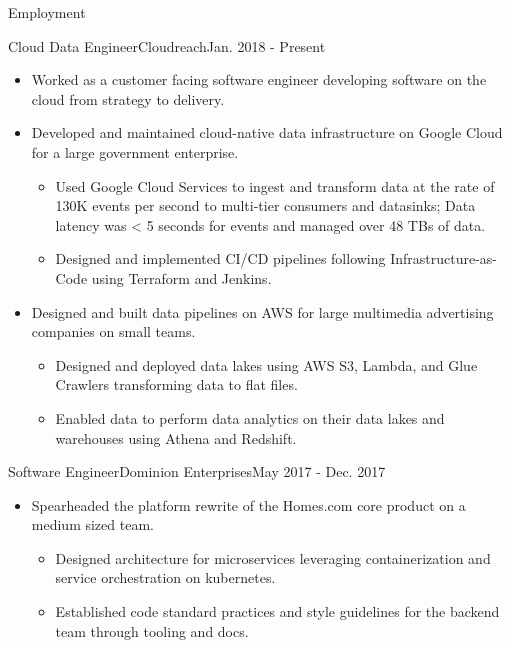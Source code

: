 \documentclass[]{mcdowellcv}
\begin{document}
    \makeheader

    \begin{cvsection}{Employment}


        \begin{cvsubsection}{Cloud Data Engineer}{Cloudreach}{Jan. 2018 - Present}
            \begin{itemize}
                \item Worked as a customer facing software engineer developing software on the cloud from strategy to delivery. 
                \item Developed and maintained cloud-native data infrastructure on Google Cloud for a large government enterprise.
                    \begin{itemize}
                            \item Used Google Cloud Services to ingest and transform data at the rate of 130K events per second to multi-tier consumers and datasinks; Data latency was < 5 seconds for events and managed over 48 TBs of data.
                            \item Designed and implemented CI/CD pipelines following Infrastructure-as-Code using Terraform and Jenkins.
                    \end{itemize}
                \end{itemize}
                \begin{itemize}
                    \item Designed and built data pipelines on AWS for large multimedia advertising companies on small teams.
                    \begin{itemize}
                        \item Designed and deployed data lakes using AWS S3, Lambda, and Glue Crawlers transforming data to flat files. 
                        \item Enabled data to perform data analytics on their data lakes and warehouses using Athena and Redshift.
                    \end{itemize}
                \end{itemize}
        \end{cvsubsection}

        \begin{cvsubsection}{Software Engineer}{Dominion Enterprises}{May 2017 - Dec. 2017}
            \begin{itemize}
                \item Spearheaded the platform rewrite of the Homes.com core product on a medium sized team.
                \begin{itemize}
                    \item Designed architecture for microservices leveraging containerization and service orchestration on kubernetes. 
                    \item Established code standard practices and style guidelines for the backend team through tooling and docs.
                \end{itemize}
            \end{itemize}
        \end{cvsubsection}


\end{cvsection}
\end{document}

